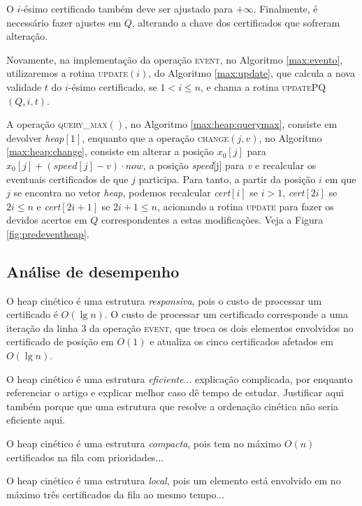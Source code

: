 

O $i$-ésimo certificado também deve ser ajustado para $+\infty$. Finalmente, é
necessário fazer ajustes em $Q$, alterando a chave dos certificados que sofreram
alteração.



Novamente, na implementação da operação \textsc{event}, no Algoritmo
\ref{max:evento}, utilizaremos a rotina \textsc{update}$(i)$, do Algoritmo
\ref{max:update}, que calcula a nova validade $t$ do $i$-ésimo certificado, se
$1 < i \leq n$, e chama a rotina \textsc{updatePQ}$(Q, i, t)$.





A operação \textsc{query\_max}$()$, no Algoritmo \ref{max:heap:querymax},
consiste em devolver \textit{heap}$[1]$, enquanto que a operação
\textsc{change}$(j, v)$, no Algoritmo \ref{max:heap:change}, consiste em alterar
a posição $x_0[j]$ para ${x_0[j] + (\mathit{speed}[j] - v)\cdot now}$, a posição
\textit{speed}[j] para \textit{v} e recalcular os eventuais certificados de que
$j$ participa. Para tanto, a partir da posição $i$ em que $j$ se encontra no
vetor \textit{heap}, podemos recalcular \textit{cert}$[i]$ se $i > 1$,
\textit{cert}$[2i]$ se $2i \leq n$ e \textit{cert}$[2i + 1]$ se $2i + 1 \leq n$,
acionando a rotina \textsc{update} para fazer os devidos acertos em $Q$
correspondentes a estas modificações. Veja a Figura \ref{fig:predeventheap}.







\subsection{Análise de desempenho}

O heap cinético é uma estrutura \textit{responsiva}, pois o custo de processar
um certificado é $O(\lg{n})$. O custo de processar um certificado corresponde a
uma iteração da linha $3$ da operação \textsc{event}, que troca os dois
elementos envolvidos no certificado de posição em $O(1)$ e atualiza os cinco
certificados afetados em $O(\lg{n})$.

O heap cinético é uma estrutura \textit{eficiente}... explicação complicada, por
enquanto referenciar o artigo e explicar melhor caso dê tempo de estudar.
Justificar aqui também porque que uma estrutura que resolve a ordenação cinética
não seria eficiente aqui.

O heap cinético é uma estrutura \textit{compacta}, pois tem no máximo $O(n)$ certificados
na fila com prioridades...

O heap cinético é uma estrutura \textit{local}, pois um elemento está envolvido
em no máximo três certificados da fila ao mesmo tempo...


